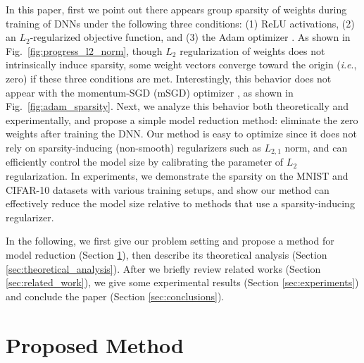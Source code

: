 \documentclass[conference]{IEEEtran}
\newcommand{\ie}{\textit{i}.\textit{e}.}
\begin{document}
In this paper, first we point out there appears group sparsity of weights during training of DNNs under the following three conditions: (1) ReLU activations, (2) an $L_2$-regularized objective function, and (3) the Adam optimizer \cite{Kingma_2015}. 
As shown in Fig.~\ref{fig:progress_l2_norm}, though $L_2$ regularization of weights does not intrinsically induce sparsity, some weight vectors converge toward the origin (\ie, zero) if these three conditions are met. 
Interestingly, this behavior does not appear with the momentum-SGD (mSGD) optimizer \cite{Qian_1999}, as shown in Fig.~\ref{fig:adam_sparsity}. 
Next, we analyze this behavior both theoretically and experimentally, and propose a simple model reduction method: eliminate the zero weights after training the DNN. 
Our method is easy to optimize since it does not rely on sparsity-inducing (non-smooth) regularizers such as $L_{2,1}$ norm, and can efficiently control the model size by calibrating the parameter of $L_2$ regularization.
In experiments, we demonstrate the sparsity on the MNIST and CIFAR-10 datasets with various training setups, and show our method can effectively reduce the model size relative to methods that use a sparsity-inducing regularizer. 

In the following, we first give our problem setting and propose a method for model reduction (Section \ref{sec:proposed_method}), then describe its theoretical analysis (Section \ref{sec:theoretical_analysis}).
After we briefly review related works (Section \ref{sec:related_work}), we give some experimental results (Section \ref{sec:experiments}) and conclude the paper (Section \ref{sec:conclusions}).

\section{Proposed Method}\label{sec:proposed_method}

\end{document}
